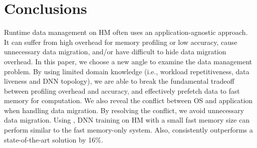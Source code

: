 \vspace{-1pt}
\section{Conclusions}
\vspace{-1pt}
Runtime data management on HM often uses an application-agnostic approach. It can suffer from high overhead for memory profiling or low accuracy, cause unnecessary data migration, and/or have difficult to hide data migration overhead. In this paper, we \textcolor{jie}{choose }
a new angle to examine the data management problem. By using limited domain knowledge (i.e., workload repetitiveness, data liveness and DNN topology), we are able to break the fundamental tradeoff between profiling overhead and accuracy, and effectively prefetch data to fast memory for computation. We also reveal the conflict between OS and application when handling data migration. By resolving the conflict, we avoid unnecessary data migration. 
Using \name, DNN training on HM with a small fast memory size can perform similar to the fast memory-only system. Also, \name consistently outperforms a state-of-the-art solution by \textcolor{check}{16\%}.


